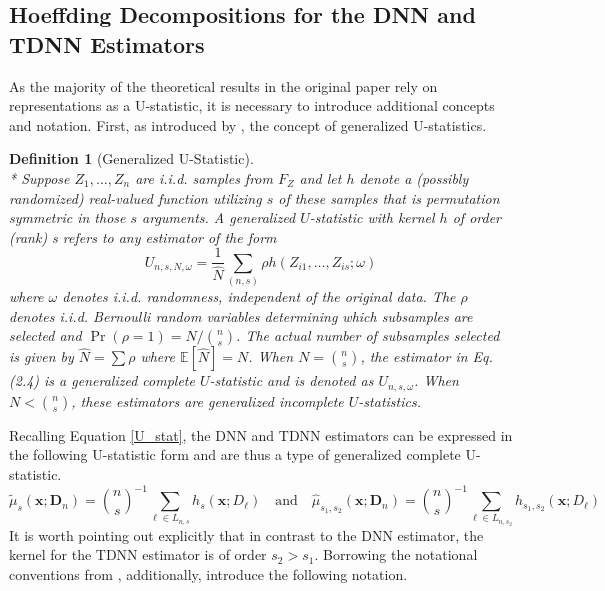 \documentclass[letterpaper,10pt]{article}
\numberwithin{equation}{section}
\numberwithin{thm}{section}
\newtheorem{dfn}{Definition}
\numberwithin{lem}{section}
\numberwithin{cor}{section}
\renewcommand{\hat}{\widehat}
\newcommand{\1}{\mathbb{1}}
\begin{document}
\subsection{Hoeffding Decompositions for the DNN and TDNN Estimators}
As the majority of the theoretical results in the original paper rely on representations as a U-statistic, it is necessary to introduce additional concepts and notation.
First, as introduced by \citet{peng_rates_2022}, the concept of generalized U-statistics.
\begin{dfn}[Generalized U-Statistic]\label{Gen_UStat}\mbox{}\\*
	Suppose $Z_1, \ldots, Z_n$ are i.i.d. samples from $F_Z$ and let $h$ denote a (possibly randomized) real-valued function utilizing $s$ of these samples that is permutation symmetric in those $s$ arguments. A generalized $U$-statistic with kernel $h$ of order (rank) s refers to any estimator of the form
	\begin{equation}
		U_{n, s, N, \omega}=\frac{1}{\hat{N}} \sum_{(n, s)} \rho h\left(Z_{i 1}, \ldots, Z_{i s} ; \omega\right)
	\end{equation}
	where $\omega$ denotes i.i.d. randomness, independent of the original data.
	The $\rho$ denotes i.i.d. Bernoulli random variables determining which subsamples are selected and $\operatorname{Pr}(\rho=1)=N /\binom{n}{s}$.
	The actual number of subsamples selected is given by $\hat{N}=\sum \rho$ where $\mathbb{E}[\hat{N}]=N$.
	When $N=\binom{n}{s}$, the estimator in Eq. (2.4) is a generalized complete $U$-statistic and is denoted as $U_{n, s, \omega}$.
	When $N<\binom{n}{s}$, these estimators are generalized incomplete $U$-statistics.
\end{dfn}
Recalling Equation \ref{U_stat}, the DNN and TDNN estimators can be expressed in the following U-statistic form and are thus a type of generalized complete U-statistic.
\begin{equation}
	\tilde{\mu}_{s}(\mathbf{x}; \mathbf{D}_n)
	= \binom{n}{s}^{-1} \sum_{\ell \in L_{n,s}} h_{s}(\mathbf{x}; D_{\ell})
	\quad \text{and} \quad
	\hat{\mu}_{s_1, s_2}(\mathbf{x}; \mathbf{D}_n)
	= \binom{n}{s}^{-1} \sum_{\ell \in L_{n,s_2}} h_{s_1, s_2}(\mathbf{x}; D_{\ell})
\end{equation}
It is worth pointing out explicitly that in contrast to the DNN estimator, the kernel for the TDNN estimator is of order $s_2 > s_1$.
Borrowing the notational conventions from \citet{lee_u-statistics_2019}, additionally, introduce the following notation.
\end{document}
